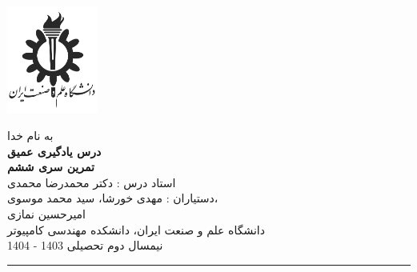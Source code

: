 \begin{minipage}{0.1\textwidth}
\includegraphics[width=3cm]{etc/IUST}
\end{minipage}%
\hfill%
\begin{minipage}{0.6\textwidth}\centering
\fontsize{13pt}{13pt}\selectfont
به‌ نام خدا \\
\textbf{درس یادگیری عمیق} \\
\textbf{تمرین سری ششم}\\
استاد درس : دکتر محمدرضا محمدی \\
دستیاران :  مهدی خورشا، سید محمد موسوی،\\ امیرحسین نمازی
\\
\vspace{0.25cm}
\begingroup
\fontsize{11pt}{11pt}\selectfont
دانشگاه علم و صنعت ایران، دانشکده مهندسی کامپیوتر \\
نیمسال دوم تحصیلی 1403 - 1404 \\
\endgroup
\end{minipage}%
\hfill%
\begin{minipage}{0.1\textwidth}

\end{minipage}

\vspace{0.5cm}

\noindent\rule{\textwidth}{1pt}